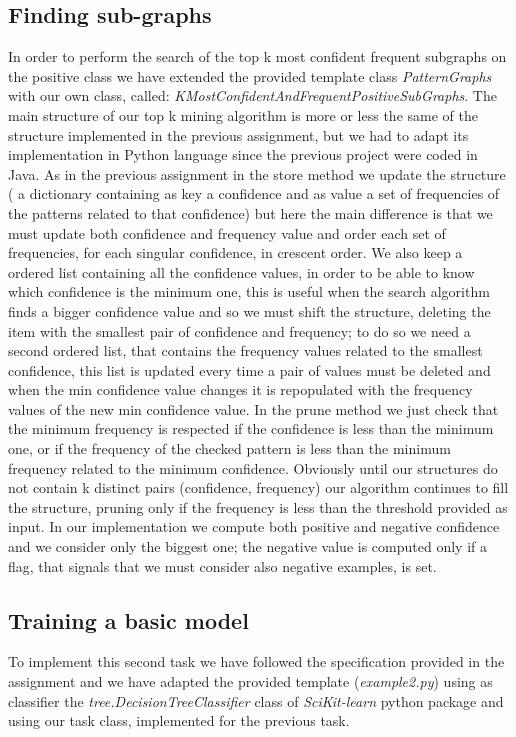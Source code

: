 \documentclass[10pt, a4paper]{article}
\begin{document}
		\subsection{Finding sub-graphs}
			In order to perform the search of the top k most confident frequent subgraphs on the positive class we have extended the provided template class \textit{PatternGraphs} with our own class, called: \newline \textit{K\textunderscore MostConfidentAndFrequentPositiveSubGraphs}.\newline
			The main structure of our top k mining algorithm is more or less the same of the structure implemented in the previous assignment, but we had to adapt its implementation in Python language since the previous project were coded in Java.
			As in the previous assignment in the store method we update the structure ( a dictionary containing as key a confidence and as value a set of frequencies of the patterns related to that confidence) but here the main difference is that we must update both confidence and frequency value and order each set of frequencies, for each singular confidence, in crescent order. We also keep a ordered list containing all the confidence values, in order to be able to know which confidence is the minimum one, this is useful when the search algorithm finds a bigger confidence value and so we must shift the structure, deleting the item with the smallest pair of confidence and frequency; to do so we need a second ordered list, that contains the frequency values related to the smallest confidence, this list is updated every time a pair of values must be deleted and when the min confidence value changes it is repopulated with the frequency values of the new min confidence value.\newline
			In the prune method we just check that the minimum frequency is respected if the confidence is less than the minimum one, or if the frequency of the checked pattern is less than the minimum frequency related to the minimum confidence.
			Obviously until our structures do not contain k distinct pairs (confidence, frequency) our algorithm continues to fill the structure, pruning only if the frequency is less than the threshold provided as input.
			In our implementation we compute both positive and negative confidence and we consider only the biggest one; the negative value is computed only if a flag, that signals that we must consider also negative examples, is set.

		\subsection{Training a basic model}
			To implement this second task we have followed the specification provided in the assignment and we have adapted the provided template (\textit{example2.py}) using as classifier the \textit{tree.DecisionTreeClassifier} class of \textit{SciKit-learn} python package and using our task class, implemented for the previous task.
\end{document}
